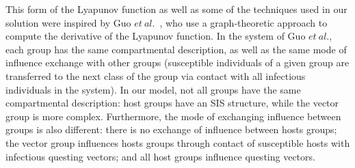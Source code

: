 \documentclass[a4paper]{article}
\begin{document}
{This form of the Lyapunov function as well as some of the techniques used in our solution were inspired by  Guo $et~al.$~\cite{Guo_li_CAMQ_06, Guo_li_PAMS08}, who use a graph-theoretic approach to compute the derivative of the Lyapunov function.  In the system of Guo $et~al.$, each group has the same compartmental description, as well as the same mode of influence exchange with other groups (susceptible individuals of a given group are transferred to the next class of the group via contact with all infectious individuals in the system). In our model, not all groups have the same compartmental description: host groups have an SIS structure, while the vector group is more complex. Furthermore,  the mode of exchanging influence between groups is also different: there is no exchange of influence between hosts groups; the vector group influences hosts groups  through contact of susceptible hosts with infectious questing vectors; and all host groups influence questing vectors.


}
\end{document}
